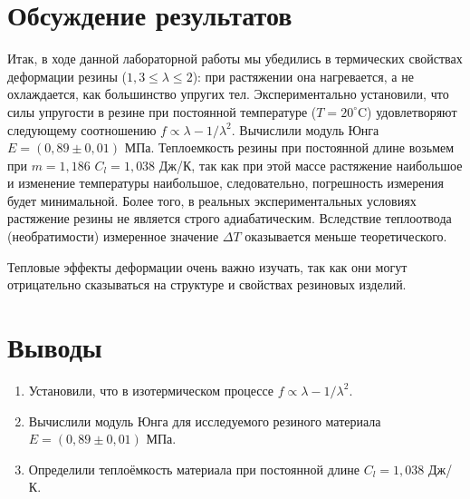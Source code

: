 \documentclass[a4paper,12pt]{article} %
\begin{document}
\section{Обсуждение результатов}
	Итак, в ходе данной лабораторной работы мы убедились в термических свойствах деформации резины ($1,3 \leq \lambda \leq 2$): при растяжении она нагревается, а не охлаждается, как большинство упругих тел. Экспериментально установили, что силы упругости в резине при постоянной температуре ($T = 20^\circ$C) удовлетворяют следующему соотношению $f \propto \lambda - 1 / \lambda^2$. Вычислили модуль Юнга $E = (0,89 \pm 0,01)$ МПа. Теплоемкость резины при постоянной длине возьмем при $m = 1,186$ $C_l = 1,038$ Дж/К, так как при этой массе растяжение наибольшое и изменение температуры наибольшое, следовательно, погрешность измерения будет минимальной. Более того, в реальных экспериментальных условиях растяжение резины не является строго адиабатическим. Вследствие теплоотвода (необратимости) измеренное значение $\Delta T$ оказывается меньше теоретического.
	
	Тепловые эффекты деформации очень важно изучать, так как они могут отрицательно сказываться на структуре и свойствах резиновых изделий.
	
\section{Выводы}
\begin{enumerate}
	\item
		Установили, что в изотермическом процессе $f \propto \lambda - 1 / \lambda^2$.
	\item
		Вычислили модуль Юнга для исследуемого резиного материала $E = (0,89 \pm 0,01)$ МПа.
	\item
		Определили теплоёмкость материала при постоянной длине $C_l = 1,038$ Дж/К.
		
\end{enumerate}
\end{document}
